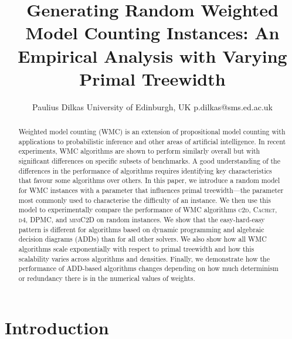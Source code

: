 \documentclass{article}
\title{Generating Random Weighted Model Counting Instances: An Empirical Analysis with Varying Primal Treewidth}
\author{%
    Paulius Dilkas
    \affiliations
    University of Edinburgh, UK
    \emails
    p.dilkas@sms.ed.ac.uk
}
\theoremstyle{definition}
\begin{document}
\maketitle

\begin{abstract} %
  Weighted model counting (\textsf{WMC}) is an extension of propositional model
  counting with applications to probabilistic inference and other areas of
  artificial intelligence. In recent experiments, \textsf{WMC} algorithms are
  shown to perform similarly overall but with significant differences on
  specific subsets of benchmarks. A good understanding of the differences in the
  performance of algorithms requires identifying key characteristics that favour
  some algorithms over others. In this paper, we introduce a random model for
  \textsf{WMC} instances with a parameter that influences primal treewidth---the
  parameter most commonly used to characterise the difficulty of an instance. We
  then use this model to experimentally compare the performance of \textsf{WMC}
  algorithms \textsc{c2d}, \textsc{Cachet}, \textsc{d4}, \textsc{DPMC}, and
  \textsc{miniC2D} on random instances. We show that the easy-hard-easy pattern
  is different for algorithms based on dynamic programming and algebraic
  decision diagrams (ADDs) than for all other solvers. We also show how all
  \textsf{WMC} algorithms scale exponentially with respect to primal treewidth
  and how this scalability varies across algorithms and densities. Finally, we
  demonstrate how the performance of ADD-based algorithms changes depending on
  how much determinism or redundancy there is in the numerical values of
  weights.
\end{abstract}

\section{Introduction}
\end{document}
